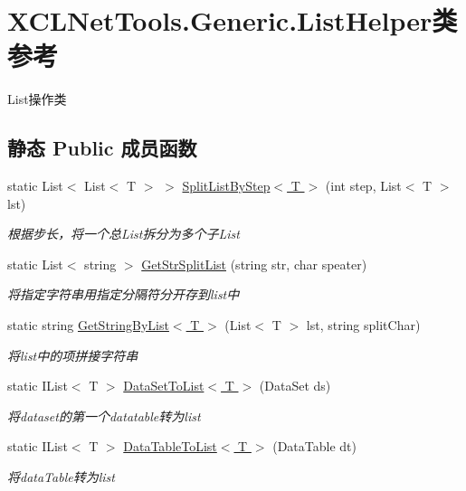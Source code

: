 \hypertarget{class_x_c_l_net_tools_1_1_generic_1_1_list_helper}{}\section{X\+C\+L\+Net\+Tools.\+Generic.\+List\+Helper类 参考}
\label{class_x_c_l_net_tools_1_1_generic_1_1_list_helper}


List操作类  


\subsection*{静态 Public 成员函数}
\begin{DoxyCompactItemize}
\item 
static List$<$ List$<$ T $>$ $>$ \hyperlink{class_x_c_l_net_tools_1_1_generic_1_1_list_helper_a38adb871b8752fb797795645625b7b4f}{Split\+List\+By\+Step$<$ T $>$} (int step, List$<$ T $>$ lst)
\begin{DoxyCompactList}\small\item\em 根据步长，将一个总\+List拆分为多个子\+List \end{DoxyCompactList}\item 
static List$<$ string $>$ \hyperlink{class_x_c_l_net_tools_1_1_generic_1_1_list_helper_a3225ddcbde7d47ccef1ab295ebbd2f1d}{Get\+Str\+Split\+List} (string str, char speater)
\begin{DoxyCompactList}\small\item\em 将指定字符串用指定分隔符分开存到list中 \end{DoxyCompactList}\item 
static string \hyperlink{class_x_c_l_net_tools_1_1_generic_1_1_list_helper_a02b07a0f7a7d4506c358650ba010f7d9}{Get\+String\+By\+List$<$ T $>$} (List$<$ T $>$ lst, string split\+Char)
\begin{DoxyCompactList}\small\item\em 将list中的项拼接字符串 \end{DoxyCompactList}\item 
static I\+List$<$ T $>$ \hyperlink{class_x_c_l_net_tools_1_1_generic_1_1_list_helper_adfbf950f29de90bc153e38c88437041a}{Data\+Set\+To\+List$<$ T $>$} (Data\+Set ds)
\begin{DoxyCompactList}\small\item\em 将dataset的第一个datatable转为list \end{DoxyCompactList}\item 
static I\+List$<$ T $>$ \hyperlink{class_x_c_l_net_tools_1_1_generic_1_1_list_helper_aa1d5d2843b5a105edf4eb8c160fcd016}{Data\+Table\+To\+List$<$ T $>$} (Data\+Table dt)
\begin{DoxyCompactList}\small\item\em 将data\+Table转为list \end{DoxyCompactList}\end{DoxyCompactItemize}


